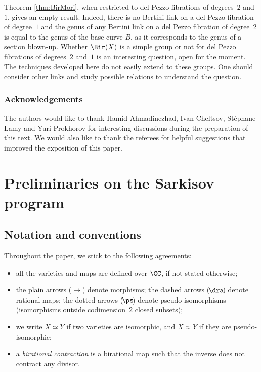 \begin{rem}
Theorem \ref{thm:BirMori}, when restricted to del Pezzo fibrations of degrees~$2$ and~$1$, gives an empty result. Indeed, there is no Bertini link on a del Pezzo fibration of degree~$1$ and the genus of any Bertini link on a del Pezzo fibration of degree~$2$ is equal to the genus of the base curve $B$, as it corresponds to the genus of a section blown-up. Whether $\Bir(X)$ is a simple group or not for del Pezzo fibrations of degrees~$2$ and~$1$ is an interesting question, open for the moment. The techniques developed here do not easily extend to these groups. One should consider other links and study possible relations to understand the question.
\end{rem}

\subsubsection*{Acknowledgements}
The authors would like to thank Hamid Ahmadinezhad, Ivan Cheltsov, Stéphane Lamy and Yuri Prokhorov for interesting discussions during the preparation of this text. We would also like to thank the referees for helpful suggestions that improved the exposition of this paper.

\section{Preliminaries on the Sarkisov program}

\subsection{Notation and conventions}

Throughout the paper, we stick to the following agreements:

\begin{itemize}
\item all the varieties and maps are defined over $\CC$, if not stated otherwise;
\item the plain arrows ($\to$) denote morphisms; the dashed arrows ($\!\dra\!$) denote rational maps; the dotted arrows ($\!\ps\!$) denote pseudo-isomorphisms (isomorphisms outside codimension~$2$ closed subsets);
\item we write $X\simeq Y$ if two varieties are isomorphic, and $X\approx Y$ if they are pseudo-isomorphic;
\item a \emph{birational contraction} is a birational map such that the inverse does not contract any divisor.
\end{itemize}

